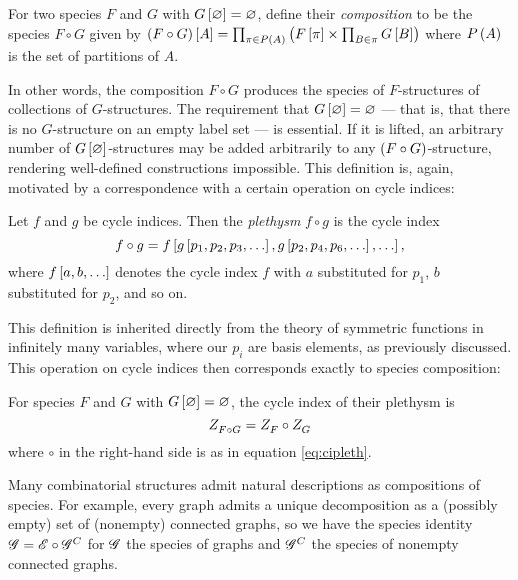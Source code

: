 \documentclass[sectionflow,singlespace,twoside,boldmathhdr,draft]{brandiss} %
\numberwithin{section}{chapter}
\numberwithin{figure}{chapter}
\begin{document}
\begin{definition}
  \label{def:speccomp}
  For two species $F$ and $G$ with $G \left[ {\varnothing} \right] = \varnothing$, define their \emph{composition} to be the species $F \circ G$ given by $\left( {F \circ G} \right) \left[ {A} \right] = \prod_{\pi \in P \left( {A} \right)} \left( {F \left[ {\pi} \right] \times \prod_{B \in \pi} G \left[ {B} \right]} \right)$ where $P \left( {A} \right)$ is the set of partitions of $A$.
\end{definition}
In other words, the composition $F \circ G$ produces the species of $F$-structures of collections of $G$-structures.
The requirement that $G \left[ {\varnothing} \right] = \varnothing$ --- that is, that there is no $G$-structure on an empty label set --- is essential.
If it is lifted, an arbitrary number of $G \left[ {\varnothing} \right]$-structures may be added arbitrarily to any $\left( {F \circ G} \right)$-structure, rendering well-defined constructions impossible.
This definition is, again, motivated by a correspondence with a certain operation on cycle indices:
\begin{definition}
  \label{def:cipleth}
  Let $f$ and $g$ be cycle indices. Then the \emph{plethysm} $f \circ g$ is the cycle index
  \begin{equation}
    \label{eq:cipleth}
    f \circ g = f \left[ {g \left[ {p_{1}, p_{2}, p_{3}, \dots} \right], g \left[ {p_{2}, p_{4}, p_{6}, \dots} \right], \dots} \right],
  \end{equation}
  where $f \left[ {a, b, \dots} \right]$ denotes the cycle index $f$ with $a$ substituted for $p_{1}$, $b$ substituted for $p_{2}$, and so on.
\end{definition}
This definition is inherited directly from the theory of symmetric functions in infinitely many variables, where our $p_{i}$ are basis elements, as previously discussed. This operation on cycle indices then corresponds exactly to species composition:
\begin{theorem}
  \label{thm:speccompci}
  For species $F$ and $G$ with $G \left[ {\varnothing} \right] = \varnothing$, the cycle index of their plethysm is
  \begin{equation}
    \label{eq:speccompci}
     Z_{F \circ G}^{}  =  Z_{F}^{}  \circ  Z_{G}^{} 
  \end{equation}
  where $\circ$ in the right-hand side is as in equation \eqref{eq:cipleth}.
\end{theorem}
Many combinatorial structures admit natural descriptions as compositions of species.
For example, every graph admits a unique decomposition as a (possibly empty) set of (nonempty) connected graphs, so we have the species identity $\mathscr{G} = \mathscr{E} \circ \mathscr{G}^{C}$ for $\mathscr{G}$ the species of graphs and $\mathscr{G}^{C}$ the species of nonempty connected graphs.
\end{document}
